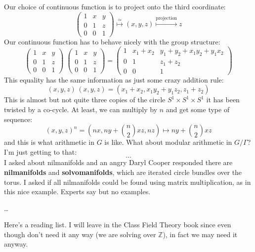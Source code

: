 \documentclass[12pt]{article}
\begin{document}
\noindent Our choice of continuous function is to project onto the third coordinate:
$$ \left( \begin{array}{ccc} 1 & x & y \\ 0 & 1 & z \\ 0 & 0 & 1 \end{array} \right) 
\stackrel{\simeq}{\mapsto} (x,y,z) \stackrel{\text{projection}}{\mapsto} z $$
Our continuous function has to behave nicely with the group structure:
$$ \left( \begin{array}{ccc} 1 & x & y \\ 0 & 1 & z \\ 0 & 0 & 1 \end{array} \right)  \; \left( \begin{array}{ccc} 1 & x & y \\ 0 & 1 & z \\ 0 & 0 & 1 \end{array} \right)  
= \left( \begin{array}{ccc} 1 & x_1 + x_2 & y_1 + y_2 + x_1 y_2 + y_1 x_2 \\ 0 & 1 & z_1 + z_2 \\ 0 & 0 & 1 \end{array} \right) $$
This equality has the same information as just some crazy addition rule:
$$ (x,y,z) \,(x,y,z) = (x_1 + x_2, x_1 y_2 + y_1 z_2 , z_1 + z_2 )  $$
This is almost but not quite three copies of the circle $S^1 \times S^1 \times S^1 $ it has been twisted by a co-cycle.  At least, we can multiply by $n$ and get some type of sequence:
$$ (x,y,z)^n = (n x,  ny + \binom{n}{2} x z , nz) \mapsto ny + \binom{n}{2} x z $$
and this is what arithmetic in $G$ is like.  What about modular arithmetic in $G/\Gamma$?  I'm just getting to that:
$$ \dots $$
I asked about nilmanifolds and an angry Daryl Cooper responded there are \textbf{nilmanifolds} and \textbf{solvomanifolds}, which are iterated circle bundles over the torus.  I asked if all nilmanifolds could be found using matrix multiplication, as in this nice example.  Experts say  but no examples.

\newpage

\dots 

\vfill


\noindent Here's a reading list. I will leave in the Class Field Theory book since even though don't need it any way (we are solving over $\mathbb{Z}$), in fact we may need it anyway.
\end{document}
